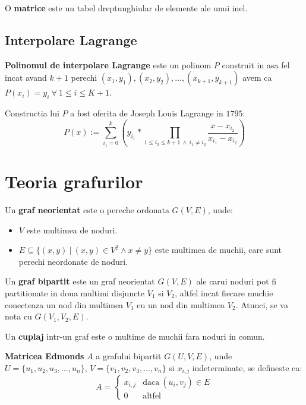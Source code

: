 \begin{defn}
  O \textbf{matrice} este un tabel dreptunghiular de elemente ale unui inel.
\end{defn}

\subsection{Interpolare Lagrange}

\textbf{Polinomul de interpolare Lagrange} este un polinom $P$ construit in asa
fel incat avand $k + 1$ perechi
$(x_{1}, y_{1}), (x_{2}, y_{2}), \ldots, (x_{k+1}, y_{k+1})$ avem ca
$P(x_{i}) = y_{i}\ \forall\ 1 \leq i \leq K + 1$. \par
Constructia lui $P$ a fost oferita de Joseph Louis Lagrange in $1795$:
\begin{equation}
  P(x) := \sum_{i_{1}=0}^{k} (y_{i_{1}} * \prod_{1 \leq i_{2} \leq k + 1 \ \land \ i_{1} \neq i_{2}} \frac{x - x_{i_{2}}}{x_{i_{1}} - x_{i_{2}}})
\end{equation}

\section{Teoria grafurilor}

\begin{defn}
  Un \textbf{graf neorientat} este o pereche ordonata $G(V, E)$, unde:
  \begin{itemize}
    \item{$V$ este multimea de noduri}.
    \item{$E \subseteq \{(x, y)\ |\ (x, y) \in V^2 \land x \neq y\}$ este
      multimea de muchii, care sunt perechi neordonate de noduri}.
  \end{itemize}
\end{defn}

\begin{defn}
  Un \textbf{graf bipartit} este un graf neorientat $G(V, E)$ ale carui noduri pot fi
  partitionate in doua multimi disjuncte $V_{1}$ si $V_{2}$, altfel incat fiecare muchie
  conecteaza un nod din multimea $V_{1}$ cu un nod din multimea $V_{2}$. Atunci,
  se va nota cu $G(V_{1}, V_{2}, E)$.
\end{defn}

\begin{defn}
  Un \textbf{cuplaj} intr-un graf este o multime de muchii fara noduri in comun.
\end{defn}

\begin{defn}
  \textbf{Matricea Edmonds} $A$ a grafului bipartit $G(U, V, E)$, unde
  $U = \{u_{1}, u_{2}, u_{3}, \ldots, u_{n}\}$,
  $V = \{v_{1}, v_{2}, v_{3}, \ldots, v_{n}\}$ si $x_{i,j}$ indeterminate, se defineste ca:
   \begin{equation}
    A=
    \begin{cases}
      x_{i,j} & \text{daca}\ (u_{i}, v_{j}) \in E \\
      0 & \text{altfel}
    \end{cases}
  \end{equation}
\end{defn}

